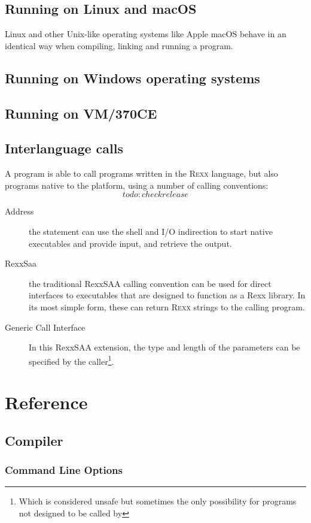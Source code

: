 \chapter{Running \crexx{} on Linux and macOS}
Linux and other Unix-like operating systems like Apple macOS behave in
an identical way when compiling, linking and running a \crexx{}
program.

\chapter{Running \crexx{} on Windows operating systems}
\chapter{Running \crexx{} on VM/370CE}
\chapter{Interlanguage calls}
A \crexx{} program is able to call programs written in the \textsc{Rexx}
language, but also programs native to the platform, using a number of
calling conventions: \[todo: checkrelease\]
\begin{description}
  \item[Address] the  statement can use the shell and
    I/O indirection to start native executables and provide input, and
    retrieve the output.
    \item[RexxSaa] the traditional RexxSAA calling convention can be
      used for direct interfaces to executables that are designed to
      function as a Rexx library. In its most simple form, these can
      return \textsc{Rexx} strings to the calling program.
      \item[Generic Call Interface] In this RexxSAA extension, the
      type and length of the parameters can be specified by the
      caller\footnote{Which is considered unsafe but sometimes the
        only possibility for programs not designed to be called by \crexx{}}.
\end{description}
\part{Reference}
\chapter{\crexx{} Compiler}
\section{Command Line Options}
\begin{shaded}
  \small
  \obeylines {}
 \end{shaded}
